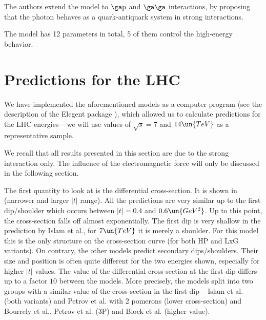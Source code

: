 The authors extend the model to $\rm\ga p$ and $\rm\ga\ga$ interactions, by proposing that the photon behaves as a quark-antiquark system in strong interactions.

The model has 12 parameters in total, 5 of them control the high-energy behavior.

\section[el pred]{Predictions for the LHC}

We have implemented the aforementioned models as a computer program (see the description of the Elegent package ), which allowed us to calculate predictions for the LHC energies -- we will use values of $\sqrt s = 7$ and $14\un{TeV}$ as a representative sample.

We recall that all results presented in this section are due to the strong interaction only. The influence of the electromagnetic force will only be discussed in the following section.

The first quantity to look at is the differential cross-section. It is shown in  (narrower and larger $|t|$ range). All the predictions are very similar up to the first dip/shoulder which occurs between $|t| = 0.4$ and $0.6\un{GeV^2}$. Up to this point, the cross-section falls off almost exponentially. The first dip is very shallow in the prediction by Islam et al., for $7\un{TeV}$ it is merely a shoulder. For this model this is the only structure on the cross-section curve (for both HP and LxG variants). On contrary, the other models predict secondary dips/shoulders. Their size and position is often quite different for the two energies shown, especially for higher $|t|$ values. The value of the differential cross-section at the first dip differs up to a factor $10$ between the models. More precisely, the models split into two groups with a similar value of the cross-section in the first dip -- Islam et al. (both variants) and Petrov et al. with 2 pomerons (lower cross-section) and Bourrely et al., Petrov et al. (3P) and Block et al. (higher value).




